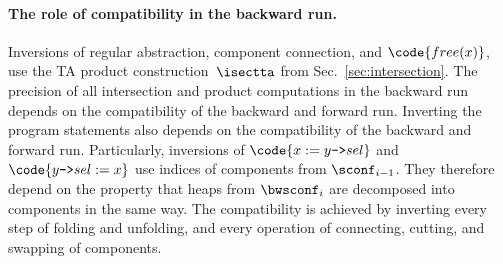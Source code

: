 {\begin{itemize}
\end{itemize}

\paragraph{The role of compatibility in the backward run.}
Inversions of regular abstraction, component connection, and $\code{free(x)}$, use the TA product construction~$\isectta$ from Sec.~\ref{sec:intersection}.
%
The precision of all intersection and product computations in the backward run
depends on the compatibility of the backward and forward run.
%
Inverting the program statements also depends on the compatibility of the backward and forward run. 
Particularly, inversions of $\code{x := y\text{\texttt{->}}sel}$ and
$\code{y\text{\texttt{->}}sel := x}$ use indices of components from $\sconf_{i-1}$. They therefore
depend on the property that heaps from $\bwsconf_{i}$ are decomposed into components in the same way.
%
%
The compatibility is achieved by inverting every step of folding and unfolding,
and every operation of connecting, cutting, and swapping of components.


}
